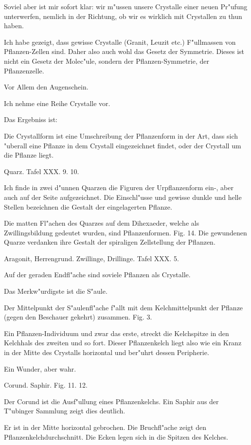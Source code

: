 \documentclass[a4paper, 11pt, oneside, german]{article}
\begin{document}
Soviel aber ist mir sofort klar: wir m"ussen unsere Crystalle einer neuen Pr"ufung unterwerfen, nemlich in der Richtung, ob wir es wirklich mit Crystallen zu thun haben.

Ich habe gezeigt, dass gewisse Crystalle (Granit, Leuzit etc.) F"ullmassen von Pflanzen-Zellen sind. Daher also auch wohl das Gesetz der Symmetrie. Dieses ist nicht ein Gesetz der Molec"ule, sondern der Pflanzen-Symmetrie, der Pflanzenzelle.

Vor Allem den Augenschein.

Ich nehme eine Reihe Crystalle vor.

Das Ergebniss ist:

Die Crystallform ist eine Umschreibung der Pflanzenform in der Art, dass sich "uberall eine Pflanze in dem Crystall eingezeichnet findet, oder der Crystall um die Pflanze liegt.

Quarz. Tafel XXX. 9. 10.

Ich finde in zwei d"unnen Quarzen die Figuren der Urpflanzenform ein-, aber auch auf der Seite aufgezeichnet. Die Einschl"usse und gewisse dunkle und helle Stellen bezeichnen die Gestalt der eingelagerten Pflanze.

Die matten Fl"achen des Quarzes auf dem Dihexaeder, welche als Zwillingsbildung gedeutet wurden, sind Pflanzenformen. Fig. 14. Die gewundenen Quarze verdanken ihre Gestalt der spiraligen Zellstellung der Pflanzen.

Aragonit, Herrengrund. Zwillinge, Drillinge. Tafel XXX. 5.

Auf der geraden Endfl"ache sind soviele Pflanzen als Crystalle.

Das Merkw"urdigste ist die S"aule.

Der Mittelpunkt der S"aulenfl"ache f"allt mit dem Kelchmittelpunkt der Pflanze (gegen den Beschauer gekehrt) zusammen. Fig. 3.

Ein Pflanzen-Individuum und zwar das erste, streckt die Kelchspitze in den Kelchhals des zweiten und so fort. Dieser Pflanzenkelch liegt also wie ein Kranz in der Mitte des Crystalls horizontal und ber"uhrt dessen Peripherie.

Ein Wunder, aber wahr.

Corund. Saphir. Fig. 11. 12.

Der Corund ist die Ausf"ullung eines Pflanzenkelchs. Ein Saphir aus der T"ubinger Sammlung zeigt dies deutlich.

Er ist in der Mitte horizontal gebrochen. Die Bruchfl"ache zeigt den Pflanzenkelchdurchschnitt. Die Ecken legen sich in die Spitzen des Kelches.
\end{document}

